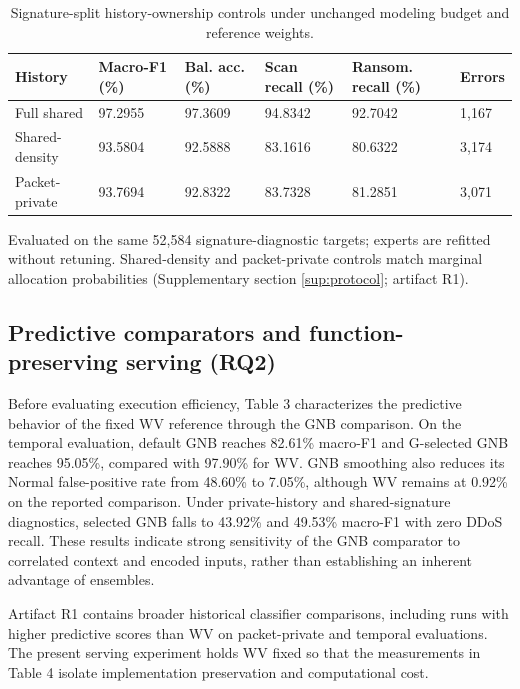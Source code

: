 \documentclass[final,3p,10pt,nopreprintline]{elsarticle}
\begin{document}
\begin{table}[H]\centering\small\setlength{\tabcolsep}{3pt}\renewcommand{\arraystretch}{1.13}
\caption{Signature-split history-ownership controls under unchanged modeling budget and reference weights.}\label{tab:history}
\begin{tabular}{L{0.21\dimexpr{}\tabcolsep\relax}L{0.15\dimexpr{}\tabcolsep\relax}L{0.16\dimexpr{}\tabcolsep\relax}L{0.14\dimexpr{}\tabcolsep\relax}L{0.18\dimexpr{}\tabcolsep\relax}L{0.16\dimexpr{}\tabcolsep\relax}}\toprule
\textbf{History} & \textbf{Macro-F1 (\%)} & \textbf{Bal. acc. (\%)} & \textbf{Scan recall (\%)} & \textbf{Ransom. recall (\%)} & \textbf{Errors}\\\midrule
Full shared & 97.2955 & 97.3609 & 94.8342 & 92.7042 & 1,167\\
Shared-density & 93.5804 & 92.5888 & 83.1616 & 80.6322 & 3,174\\
Packet-private & 93.7694 & 92.8322 & 83.7328 & 81.2851 & 3,071\\
\bottomrule\end{tabular}
\end{table}

Evaluated on the same 52,584 signature-diagnostic targets; experts are refitted without retuning. Shared-density and packet-private controls match marginal allocation probabilities (Supplementary section \ref*{sup:protocol}; artifact R1).

\subsection{Predictive comparators and function-preserving serving (RQ2)}

Before evaluating execution efficiency, Table 3 characterizes the predictive behavior of the fixed WV reference through the GNB comparison. On the temporal evaluation, default GNB reaches 82.61\% macro-F1 and G-selected GNB reaches 95.05\%, compared with 97.90\% for WV. GNB smoothing also reduces its Normal false-positive rate from 48.60\% to 7.05\%, although WV remains at 0.92\% on the reported comparison. Under private-history and shared-signature diagnostics, selected GNB falls to 43.92\% and 49.53\% macro-F1 with zero DDoS recall. These results indicate strong sensitivity of the GNB comparator to correlated context and encoded inputs, rather than establishing an inherent advantage of ensembles.

Artifact R1 contains broader historical classifier comparisons, including runs with higher predictive scores than WV on packet-private and temporal evaluations. The present serving experiment holds WV fixed so that the measurements in Table 4 isolate implementation preservation and computational cost.
\end{document}
